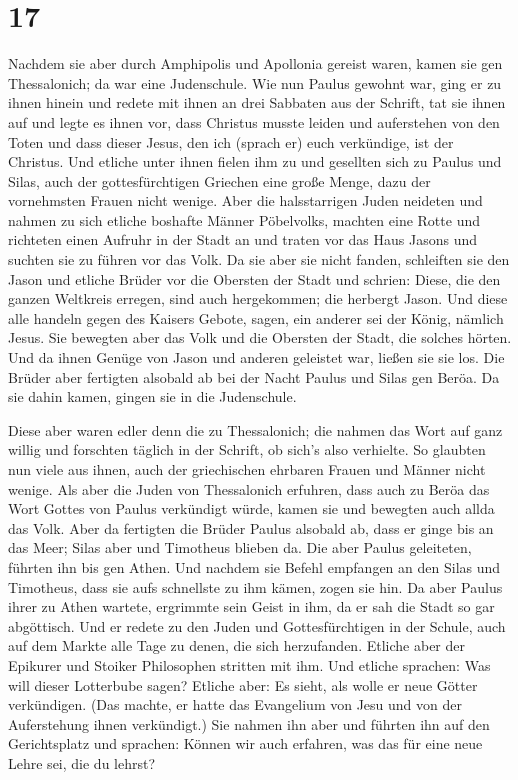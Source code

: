 \hypertarget{section-16}{%
\section{17}\label{section-16}}

 Nachdem sie aber durch Amphipolis und Apollonia gereist
waren, kamen sie gen Thessalonich; da war eine Judenschule.
 Wie nun Paulus gewohnt war, ging er zu ihnen hinein und
redete mit ihnen an drei Sabbaten aus der Schrift,  tat
sie ihnen auf und legte es ihnen vor, dass Christus musste leiden und
auferstehen von den Toten und dass dieser Jesus, den ich (sprach er)
euch verkündige, ist der Christus.  Und etliche unter
ihnen fielen ihm zu und gesellten sich zu Paulus und Silas, auch der
gottesfürchtigen Griechen eine große Menge, dazu der vornehmsten Frauen
nicht wenige.  Aber die halsstarrigen Juden neideten und
nahmen zu sich etliche boshafte Männer Pöbelvolks, machten eine Rotte
und richteten einen Aufruhr in der Stadt an und traten vor das Haus
Jasons und suchten sie zu führen vor das Volk.  Da sie
aber sie nicht fanden, schleiften sie den Jason und etliche Brüder vor
die Obersten der Stadt und schrien: Diese, die den ganzen Weltkreis
erregen, sind auch hergekommen;  die herbergt Jason. Und
diese alle handeln gegen des Kaisers Gebote, sagen, ein anderer sei der
König, nämlich Jesus.  Sie bewegten aber das Volk und die
Obersten der Stadt, die solches hörten.  Und da ihnen
Genüge von Jason und anderen geleistet war, ließen sie sie los.
 Die Brüder aber fertigten alsobald ab bei der Nacht
Paulus und Silas gen Beröa. Da sie dahin kamen, gingen sie in die
Judenschule.

 Diese aber waren edler denn die zu Thessalonich; die
nahmen das Wort auf ganz willig und forschten täglich in der Schrift, ob
sich's also verhielte.  So glaubten nun viele aus ihnen,
auch der griechischen ehrbaren Frauen und Männer nicht wenige.
 Als aber die Juden von Thessalonich erfuhren, dass auch
zu Beröa das Wort Gottes von Paulus verkündigt würde, kamen sie und
bewegten auch allda das Volk.  Aber da fertigten die
Brüder Paulus alsobald ab, dass er ginge bis an das Meer; Silas aber und
Timotheus blieben da.  Die aber Paulus geleiteten,
führten ihn bis gen Athen. Und nachdem sie Befehl empfangen an den Silas
und Timotheus, dass sie aufs schnellste zu ihm kämen, zogen sie hin.
 Da aber Paulus ihrer zu Athen wartete, ergrimmte sein
Geist in ihm, da er sah die Stadt so gar abgöttisch.  Und
er redete zu den Juden und Gottesfürchtigen in der Schule, auch auf dem
Markte alle Tage zu denen, die sich herzufanden.  Etliche
aber der Epikurer und Stoiker Philosophen stritten mit ihm. Und etliche
sprachen: Was will dieser Lotterbube sagen? Etliche aber: Es sieht, als
wolle er neue Götter verkündigen. (Das machte, er hatte das Evangelium
von Jesu und von der Auferstehung ihnen verkündigt.)  Sie
nahmen ihn aber und führten ihn auf den Gerichtsplatz und sprachen:
Können wir auch erfahren, was das für eine neue Lehre sei, die du
lehrst?

